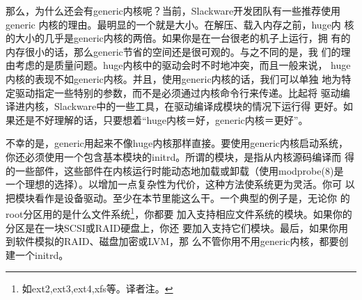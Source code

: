 那么，为什么还会有generic内核呢？当前，Slackware开发团队有一些推荐使用
generic 内核的理由。最明显的一个就是大小。在解压、载入内存之前，huge内
核的大小的几乎是generic内核的两倍。如果你是在一台很老的机子上运行，拥
有的内存很小的话，那么generic节省的空间还是很可观的。与之不同的是，我
们的理由考虑的是质量问题。huge内核中的驱动会时不时地冲突，而且一般来说，
huge内核的表现不如generic内核。并且，使用generic内核的话，我们可以单独
地为特定驱动指定一些特别的参数，而不是必须通过内核命令行来传递。比起将
驱动编译进内核，Slackware中的一些工具，在驱动编译成模块的情况下运行得
更好。如果还是不好理解的话，只要想着``huge内核＝好，generic内核＝更好''。

不幸的是，generic用起来不像huge内核那样直接。要使用generic内核启动系统，
你还必须使用一个包含基本模块的initrd。所谓的模块，是指从内核源码编译而
得的一些部件，这些部件在内核运行时能动态地加载或卸载（使用modprobe(8)是
一个理想的选择）。以增加一点复杂性为代价，这种方法使系统更为灵活。你可
以把模块看作是设备驱动。至少在本节里能这么干。一个典型的例子是，无论你
的root分区用的是什么文件系统\footnote{如ext2,ext3,ext4,xfs等。译者注。}，你都要
加入支持相应文件系统的模块。如果你的分区是在一块SCSI或RAID硬盘上，你还
要加入支持它们模块。最后，如果你用到软件模拟的RAID、磁盘加密或LVM，那
么不管你用不用generic内核，都要创建一个initrd。

